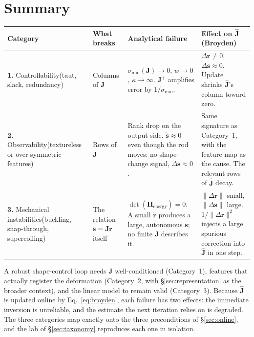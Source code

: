 \documentclass[11pt,a4paper]{article}
\begin{document}
\newpage
\section{Summary}
\label{sec:summary}

\begin{center}
\renewcommand{\arraystretch}{1.55}
\begin{tabular}{@{} p{3.4cm} p{2.8cm} p{4.4cm} p{4.0cm} @{}}
\toprule
\textbf{Category} & \textbf{What breaks} & \textbf{Analytical failure} & \textbf{Effect on $\hat{\mathbf{J}}$ (Broyden)} \\
\midrule
\textbf{1.} Controllability\newline (taut, slack, redundancy) & Columns of $\mathbf{J}$ & $\sigma_{\min}(\mathbf{J})\to 0$, $w\to 0$, $\kappa\to\infty$. $\mathbf{J}^{+}$ amplifies error by $1/\sigma_{\min}$. & $\Delta\mathbf{r}\neq 0$, $\Delta\mathbf{s}\approx 0$. Update shrinks $\hat{\mathbf{J}}$'s column toward zero. \\
\rowcolor{black!5}
\textbf{2.} Observability\newline (textureless or over-symmetric features) & Rows of $\mathbf{J}$ & Rank drop on the output side. $\dot{\mathbf{s}}\approx 0$ even though the rod moves; no shape-change signal, $\Delta\mathbf{s} \approx 0$. & Same signature as Category~1, with the feature map as the cause. The relevant rows of $\hat{\mathbf{J}}$ decay. \\
\textbf{3.} Mechanical instabilities\newline (buckling, snap-through, supercoiling) & The relation $\dot{\mathbf{s}} = \mathbf{J}\dot{\mathbf{r}}$ itself & $\det(\mathbf{H}_{\mathrm{energy}})=0$. A small $\dot{\mathbf{r}}$ produces a large, autonomous $\dot{\mathbf{s}}$; no finite $\mathbf{J}$ describes it. & $\|\Delta\mathbf{r}\|$ small, $\|\Delta\mathbf{s}\|$ large. $1/\|\Delta\mathbf{r}\|^2$ injects a large spurious correction into $\hat{\mathbf{J}}$ in one step. \\
\bottomrule
\end{tabular}
\end{center}

\vspace{1em}
\noindent A robust shape-control loop needs $\mathbf{J}$ well-conditioned (Category~1), features
that actually register the deformation (Category~2, with \S\ref{sec:representation} as the
broader context), and the linear model to remain valid (Category~3). Because $\hat{\mathbf{J}}$ is
updated online by Eq.~\eqref{eq:broyden}, each failure has two effects: the immediate
inversion is unreliable, and the estimate the next iteration relies on is degraded. The three
categories map exactly onto the three preconditions of \S\ref{sec:online}, and the lab of
\S\ref{sec:taxonomy} reproduces each one in isolation.
\end{document}
